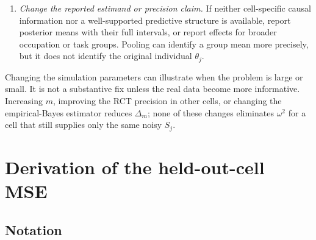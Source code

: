 \documentclass[11pt]{article}
\begin{document}
\begin{enumerate}[label=\arabic*.,leftmargin=2.2em]
 \item \textit{Change the reported estimand or precision claim.} If neither
 cell-specific causal information nor a well-supported predictive structure
 is available, report posterior means with their full intervals, or report
 effects for broader occupation or task groups. Pooling can identify a group
 mean more precisely, but it does not identify the original individual
 \(\theta_j\).
\end{enumerate}

Changing the simulation parameters can illustrate when the problem is large
or small. It is not a substantive fix unless the real data become more
informative. Increasing \(m\), improving the RCT precision in other cells, or
changing the empirical-Bayes estimator reduces \(\Delta_m\); none of these
changes eliminates \(\omega^2\) for a cell that still supplies only the same
noisy \(S_j\).

\appendix

\section{Derivation of the held-out-cell MSE}

\subsection*{Notation}
\end{document}
